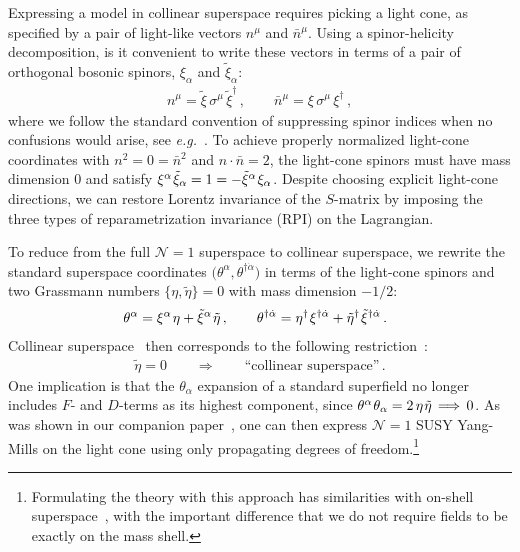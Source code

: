 \documentclass[12pt,document,nofootinbib,superscriptaddress,onecolumn,preprintnumbers,balancelastpage]{article}
\newcommand{\s}{\hspace{0.8pt}}
\begin{document}
\begin{spacing}{1.2}
Expressing a model in collinear superspace requires picking a light cone, as specified by a pair of light-like vectors $n^\mu$ and $\bar{n}^\mu$.
%
Using a spinor-helicity decomposition, is it convenient to write these vectors in terms of a pair of orthogonal bosonic spinors, $\xi_\alpha$ and $\tilde{\xi}_\alpha$:
%
\begin{align}
n^\mu = \tilde{\xi}\, \sigma^\mu\, \tilde{\xi}^\dagger\,, \qquad \bar{n}^\mu = \xi\, \sigma^\mu\, \xi^{\dagger}\,,
\label{eq:nAndnBar}
\end{align} 
%
where we follow the standard convention of suppressing spinor indices when no confusions would arise, see \emph{e.g.}~\cite{Dreiner:2008tw}.
%
To achieve properly normalized light-cone coordinates with $n^2 = 0 = \bar{n}^2$ and $n\cdot\bar{n} = 2$, the light-cone spinors must have mass dimension $0$ and satisfy $\xi^\alpha\s \tilde{\xi}_\alpha= 1 = -  \tilde{\xi}^\alpha\s \xi_\alpha$.
%
Despite choosing explicit light-cone directions, we can restore Lorentz invariance of the $S$-matrix by imposing the three types of reparametrization invariance (RPI) \cite{Manohar:2002fd, Becher:2014oda, Cohen:2019wxr,Kogut:1969xa} on the Lagrangian.


To reduce from the full $\mathcal{N}=1$ superspace to collinear superspace, we rewrite the standard superspace coordinates $\big(\theta^\alpha, \theta^{\dag\dot\alpha}\big)$ in terms of the light-cone spinors and two Grassmann numbers $\bigl\{ \eta, \tilde{\eta} \bigr\} = 0$ with mass dimension $-1/2$: 
%
\begin{align}
&\ \theta^\alpha = \xi^\alpha\s \eta + \tilde{\xi}^{\alpha}\s \tilde{\eta}\, , \qquad \theta^{\dagger\dot{\alpha}} = \eta^\dagger \s \xi^{\dagger \dot{\alpha}} + \tilde{\eta}^\dagger \s \tilde{\xi}^{\dagger \dot{\alpha}} \, .
\label{eq:theta}
\end{align}
%
Collinear superspace~\cite{Cohen:2016jzp,Cohen:2016dcl} then corresponds to the following restriction~\cite{Cohen:2018qvn}:
\begin{align}
\tilde{\eta} = 0 \qquad \Longrightarrow \qquad \text{``collinear superspace''}\,.
\label{eq:etaEq0}
\end{align}
%
One implication is that the $\theta_\alpha$ expansion of a standard superfield no longer includes $F$- and $D$-terms as its highest component, since $\theta^\alpha\s \theta_\alpha = 2\, \eta \s \tilde{\eta}\, \Longrightarrow\, 0$.
%
As was shown in our companion paper~\cite{Cohen:2018qvn}, one can then express $\mathcal{N} = 1$ SUSY Yang-Mills on the light cone using only propagating degrees of freedom.\footnote{Formulating the theory with this approach has similarities with on-shell superspace~\cite{Gates:1982an, Brink:1980cb, Elvang:2013cua}, with the important difference that we do not require fields to be exactly on the mass shell.}



\end{spacing}
\end{document}
